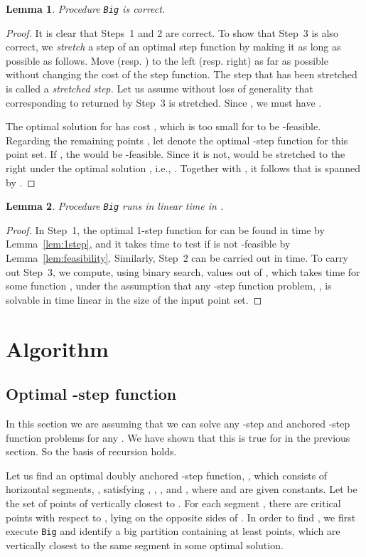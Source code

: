 \documentclass[preprint,10pt]{elsarticle}
\newtheorem{lemma}{Lemma}
\begin{document}
\begin{lemma}\label{lem:Bigiscorrect}
Procedure {\tt Big} is correct.
\end{lemma}
\begin{proof}
It is clear that Steps~1 and 2 are correct.
To show that Step~3 is also correct, 
we {\em stretch} a step  of an optimal step function
by making it as long as possible as follows.
Move  (resp. ) to the left (resp. right) as far as possible without changing the cost
of the step function.
The step that has been stretched is called a {\em stretched step.} 
Let us assume without loss of generality that  corresponding to  returned by Step~3 is stretched.
Since ,
we must have .

The optimal solution  for  has cost ,
which is too small for  to be -feasible.
Regarding the remaining points ,
let  denote the optimal -step function for this point set.
If ,
the  would be -feasible.
Since it is not,
  would be stretched to the right under the optimal solution ,
i.e., .
Together with ,
it follows that  is spanned by .
\end{proof}

\begin{lemma}\label{lem:Bigislinear}
Procedure {\tt Big} runs in linear time in .
\end{lemma}
\begin{proof}
In Step~1, the optimal 1-step function for  can be found in  time by Lemma~\ref{lem:1step},
and it takes  time to test if  is not -feasible by Lemma~\ref{lem:feasibility}.
Similarly, Step~2 can be carried out in  time.
To carry out Step~3,
we compute, using binary search,  values out of ,
which takes  time for some function ,
under the assumption that any -step function problem, ,
is solvable in time linear in the size of the input point set.
\end{proof}


\section{Algorithm}\label{sec:algorithm}
\subsection{Optimal -step function}
In this section we are assuming that we can solve any -step and anchored
-step function problems for any .
We have shown that this is true for  in the previous section.
So the basis of recursion holds. 

Let us find an optimal doubly anchored -step function, ,
which consists of  horizontal segments,
,
satisfying ,  ,   ,  and ,
where  and  are given constants.
Let   {be}  the set of points of  vertically closest to . For each segment , there are critical points with respect to , lying on the opposite sides of .
In order to find , 
we first execute {\tt Big}
and identify a big partition containing at least  points,
which are vertically closest to the same segment in some optimal solution.
\end{document}
